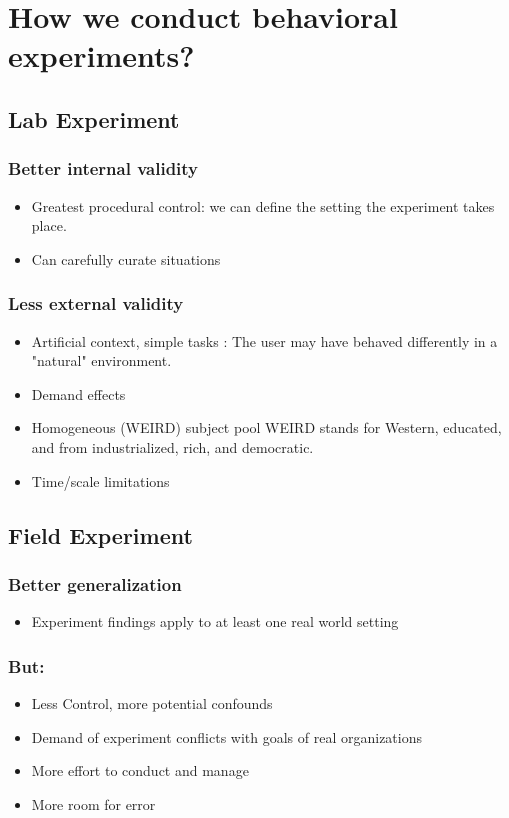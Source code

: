 \section{How we conduct behavioral experiments?}
\subsection{Lab Experiment}
\subsubsection{Better internal validity}
\begin{itemize}
\item Greatest procedural control: we can define the setting the experiment takes place.
\item Can carefully curate situations
\end{itemize}

\subsubsection{Less external validity}
\begin{itemize}
\item Artificial context, simple tasks : \newline
The user may have behaved differently in a "natural" environment.
\item Demand effects 
\item Homogeneous (WEIRD) subject pool \newline
WEIRD stands for Western, educated, and from industrialized, rich, and democratic.
\item Time/scale limitations
\end{itemize}

\subsection{Field Experiment}
\subsubsection{Better generalization}
\begin{itemize}
\item Experiment findings apply to at least one real world setting
\end{itemize}

\subsubsection{But:}
\begin{itemize}
\item Less Control, more potential confounds
\item Demand of experiment conflicts with goals of real organizations
\item More effort to conduct and manage
\item More room for error
\end{itemize}

